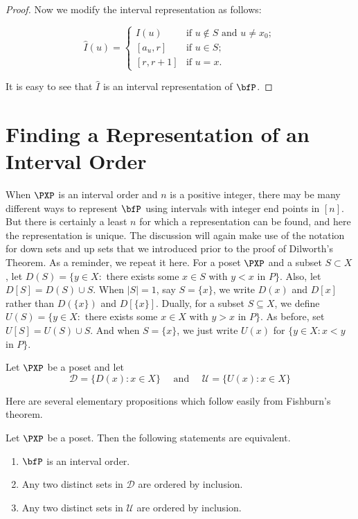 \begin{proof}
\medskip
Now we modify the interval representation as follows:

\begin{equation*}
\widehat{I}(u)=
\begin{cases}
I(u)&\text{if $u\notin S$ and $u\neq x_0$};\\
[a_u,r]&\text{if $u\in S$};\\ 
[r,r+1]&\text{if $u = x$}.
\end{cases}
\end{equation*}

It is easy to see that $\widehat{I}$ is an interval representation of
$\bfP$.
\end{proof}

\section{Finding a Representation of an Interval Order}
\label{s:posets:intervalorder:findrep}

When $\PXP$ is an interval order and $n$ is a positive integer, there
may be many different ways to represent $\bfP$ using intervals with
integer end points in $[n]$.  But there is certainly a least $n$ for
which a representation can be found, and here the representation is
unique.  The discussion will again make use of the notation for down
sets and up sets that we introduced prior to the proof of Dilworth's
Theorem. As a reminder, we repeat it here. For a poset $\PXP$ and a
subset $S\subset X$, let $D(S) = \{y\in X:$ there exists some $x\in S$
with $y<x$ in $P\}$.  Also, let $D[S]=D(S)\cup S$.  When $|S|=1$, say
$S=\{x\}$, we write $D(x)$ and $D[x]$ rather than $D(\{x\})$ and
$D[\{x\}]$.  Dually, for a subset $S\subseteq X$, we define $U(S) =
\{y\in X:$ there exists some $x\in X$ with $y>x$ in $P\}$.  As before,
set $U[S]=U(S)\cup S$.  And when $S=\{x\}$, we just write $U(x)$ for
$\{y\in X:x<y$ in $P\}$.

Let $\PXP$ be a poset and let
\[
\mathcal{D} = \{D(x):x\in X\}\quad\text{ and }\quad
\mathcal{U} = \{U(x):x\in X\}
\]

Here are several elementary propositions which
follow easily from Fishburn's theorem.

\begin{proposition}\label{prop:char-intord}
Let $\PXP$ be a poset.  Then the following statements
are equivalent.
\begin{enumerate}
\item $\bfP$ is an interval order.
\item Any two distinct sets in $\mathcal{D}$ are ordered by inclusion.
\item Any two distinct sets in $\mathcal{U}$ are ordered by inclusion.
\end{enumerate}
\end{proposition}

